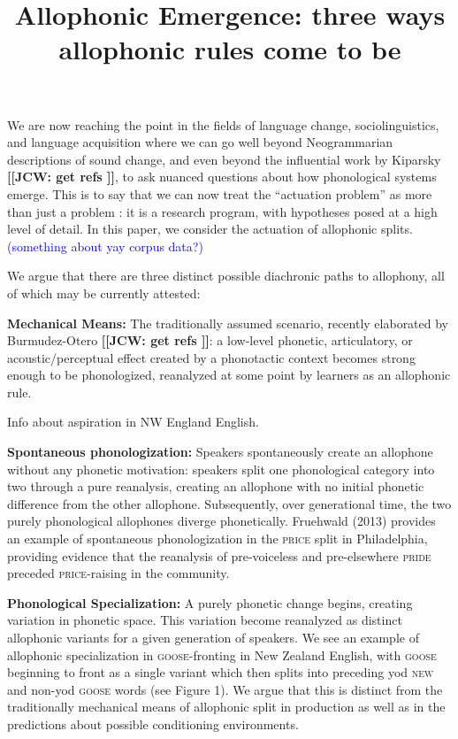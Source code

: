 \documentclass[10pt,letterpaper]{article}
\newcommand{\noteme}[1]{\noindent \textbf{[[JCW:  #1 ]]}}
\begin{document}
\title{Allophonic Emergence: three ways allophonic rules come to be}
\author{}
\date{}
\maketitle


We are now reaching the point in the fields of language change, sociolinguistics, and language acquisition where we can go well beyond Neogrammarian descriptions of sound change, and even beyond the influential work by Kiparsky \noteme{get refs}, to ask nuanced questions about how phonological systems emerge. This is to say that we can now treat the ``actuation problem'' as more than just a problem \citep{wlh1968}: it is a research program, with hypotheses posed at a high level of detail. In this paper, we consider the actuation of allophonic splits. \textcolor{blue}{(something about yay corpus data?)}

We argue that there are three distinct possible diachronic paths to allophony, all of which may be currently attested:

\textbf{Mechanical Means:} The traditionally assumed scenario, recently elaborated by Burmudez-Otero \noteme{get refs}: a low-level phonetic, articulatory, or acoustic/perceptual effect created by a phonotactic context becomes strong enough to be phonologized, reanalyzed at some point by learners as an allophonic rule. 

Info about aspiration in NW England English. 

\textbf{Spontaneous phonologization:} Speakers spontaneously create an allophone without any phonetic motivation: speakers split one phonological category into two through a pure reanalysis, creating an allophone with no initial phonetic difference from the other allophone. Subsequently, over generational time, the two purely phonological allophones diverge phonetically. Fruehwald (2013) provides an example of spontaneous phonologization in the \textsc{price} split in Philadelphia, providing evidence that the reanalysis of pre-voiceless  and pre-elsewhere \textsc{pride} preceded \textsc{price}-raising in the community.

\floatbarrier
\textbf{Phonological Specialization:} %
A purely phonetic change begins, creating variation in phonetic space. This variation become reanalyzed as distinct allophonic variants for a given generation of speakers. We see an example of allophonic specialization in \textsc{goose}-fronting in New Zealand English, with \textsc{goose} beginning to front as a single variant which then splits into preceding yod \textsc{new} and non-yod \textsc{goose} words (see Figure 1). We argue that this is distinct from the traditionally mechanical means of allophonic split in production as well as in the predictions about possible conditioning environments.
\end{document}
